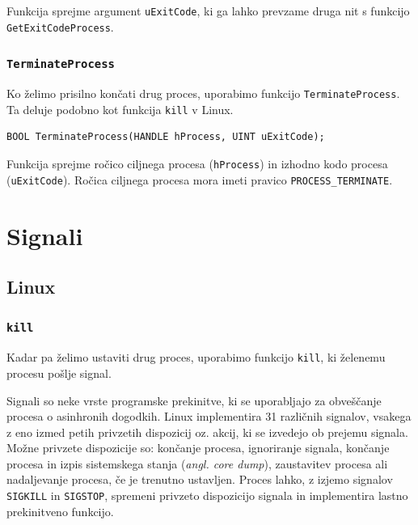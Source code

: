 \documentclass[a4paper,12pt,openright]{book}
\begin{document}
Funkcija sprejme argument \texttt{uExitCode}, ki ga lahko prevzame druga nit s funkcijo \texttt{GetExitCodeProcess}.

\subsubsection{\texttt{TerminateProcess}}

Ko želimo prisilno končati drug proces, uporabimo funkcijo \texttt{TerminateProcess}.
Ta deluje podobno kot funkcija \texttt{kill} v Linux.

\begin{lstlisting}[style=func]
 BOOL TerminateProcess(HANDLE hProcess, UINT uExitCode);
\end{lstlisting}

Funkcija sprejme ročico ciljnega procesa (\texttt{hProcess}) in izhodno kodo procesa (\texttt{uExitCode}).
Ročica ciljnega procesa mora imeti pravico \texttt{PROCESS\_TERMINATE}.

\section{Signali}

\subsection{Linux}

\subsubsection{\texttt{kill}}

Kadar pa želimo ustaviti drug proces, uporabimo funkcijo \texttt{kill}, ki želenemu procesu pošlje signal.

Signali so neke vrste programske prekinitve, ki se uporabljajo za obveščanje procesa o asinhronih dogodkih. %
Linux implementira 31 različnih signalov, vsakega z eno izmed petih privzetih dispozicij oz. akcij, ki se izvedejo ob prejemu signala.
Možne privzete dispozicije so: končanje procesa, ignoriranje signala, končanje procesa in izpis sistemskega stanja (\textit{angl. core dump}), zaustavitev procesa ali nadaljevanje procesa, če je trenutno ustavljen.
Proces lahko, z izjemo signalov \texttt{SIGKILL} in \texttt{SIGSTOP}, spremeni privzeto dispozicijo signala in implementira lastno prekinitveno funkcijo.
\end{document}
